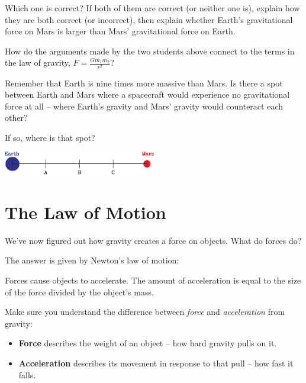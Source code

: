 \documentclass[12pt]{article}
\begin{document}
\newpage

Which one is correct? If both of them are correct (or neither one is), explain how they are both correct (or incorrect), then explain whether Earth's gravitational force on Mars is larger than Mars' gravitational force on Earth.

\vspace{2in}

How do the arguments made by the two students above connect to the terms in the law of gravity, $F = \frac{Gm_1m_2}{r^2}$?

\vspace{1.5in}

Remember that Earth is nine times more massive than Mars. Is there a spot between Earth and Mars where a spacecraft would experience no gravitational force at all -- where Earth's gravity and Mars' gravity would counteract each other?

If so, where is that spot?

\begin{center}
	\includegraphics[width=0.5\textwidth]{earth-mars-crop.pdf}
\end{center}

\newpage

\section{The Law of Motion}

We've now figured out how gravity creates a force on objects. What do forces do?

The answer is given by Newton's law of motion:
	\begin{center}
	
	
	\begin{minipage}{0.9\textwidth}
		
		Forces cause objects to accelerate. The amount of acceleration is equal to the size of the force divided by the object's mass.
		
	\end{minipage}
\end{center}

Make sure you understand the difference between {\it force} and {\it acceleration} from gravity:

\begin{itemize}
\item {\bf Force} describes the weight of an object -- how hard gravity pulls on it.
\item {\bf Acceleration} describes its movement in response to that pull -- how fast it falls.
\end{itemize}
\end{document}
